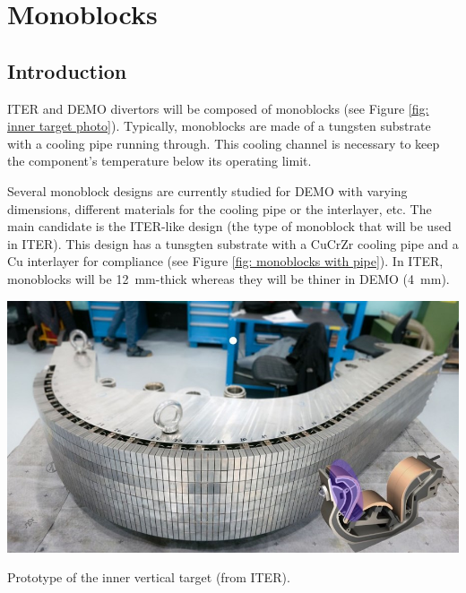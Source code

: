 \setchapterpreamble[u]{\margintoc}
\chapter{Monoblocks}

\section{Introduction}
ITER and DEMO divertors will be composed of monoblocks (see Figure \ref{fig: inner target photo}).
Typically, monoblocks are made of a tungsten substrate with a cooling pipe running through.
This cooling channel is necessary to keep the component's temperature below its operating limit.

Several monoblock designs are currently studied for DEMO with varying dimensions, different materials for the cooling pipe or the interlayer, etc.
The main candidate is the ITER-like design (the type of monoblock that will be used in ITER).
This design has a tunsgten substrate with a CuCrZr cooling pipe and a Cu interlayer for compliance (see Figure \ref{fig: monoblocks with pipe}).
In ITER, monoblocks will be \SI{12}{mm}-thick whereas they will be thiner in DEMO (\SI{4}{mm}).

\begin{marginfigure}
    \centering
    \includegraphics[width=\linewidth]{Figures/Chapter3/inner_target_iter.jpg}
    \caption{Prototype of the inner vertical target (from ITER).}
    \label{fig: inner target photo}
\end{marginfigure}

